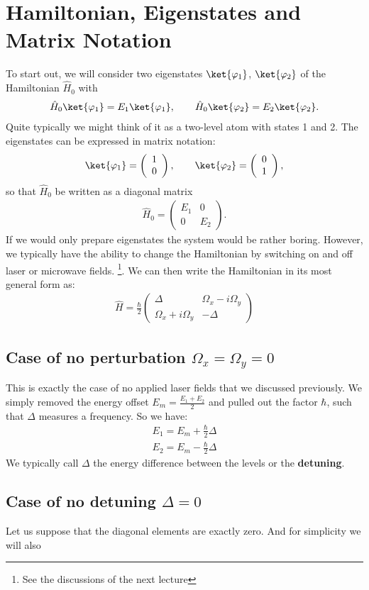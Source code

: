 \section{Hamiltonian, Eigenstates and Matrix Notation}

To start out, we will consider two eigenstates $\ket{\varphi_1}$, $\ket{\varphi_2}$ of the Hamiltonian $\hat{H}_0$ with
\begin{align}
 \hat{H}_0\ket{\varphi_1}=E_1\ket{\varphi_1}, \qquad \hat{H}_0\ket{\varphi_2}=E_2\ket{\varphi_2}.
\end{align}
Quite typically we might think of it as a two-level atom with states 1 and 2. The eigenstates can be expressed in matrix notation:
\begin{align}
 \ket{\varphi_1}=\left( \begin{array}{c} 1 \\ 0 \end{array} \right), \qquad \ket{\varphi_2}=\left( \begin{array}{c} 0 \\ 1 \end{array} \right),
\end{align}
so that $\hat{H}_0$ be written as a diagonal matrix
\begin{align}
    \hat{H}_0 = \left(\begin{array}{cc} E_1 & 0 \\ 0 & E_2 \end{array}\right).
\end{align}
If we would only prepare eigenstates the system would be rather boring. However, we typically have the ability to change the Hamiltonian by switching on and off laser or microwave fields. \footnote{See the discussions of the next lecture}. We can then write the Hamiltonian in its most general form as:
\begin{align}
\hat{H} = \frac{\hbar}{2}\left( \begin{array}{cc} \Delta  & \Omega_x - i\Omega_y\\ \Omega_x +i\Omega_y & -\Delta \end{array} \right)
\end{align}

\subsection{Case of no perturbation $\Omega_x = \Omega_y = 0$}

This is exactly the case of no applied laser fields that we discussed previously. We simply removed the energy offset $E_m = \frac{E_1+E_2}{2}$ and pulled out the factor $\hbar$, such that $\Delta$ measures a frequency. So we have:
\begin{align}
E_1 = E_m+ \frac{\hbar}{2}\Delta\\
E_2 = E_m- \frac{\hbar}{2}\Delta
\end{align}
We typically call $\Delta$ the energy difference between the levels or the \textbf{detuning}.

\subsection{Case of no detuning $\Delta = 0$}

Let us suppose that the diagonal elements are exactly zero. And for simplicity we will also 

